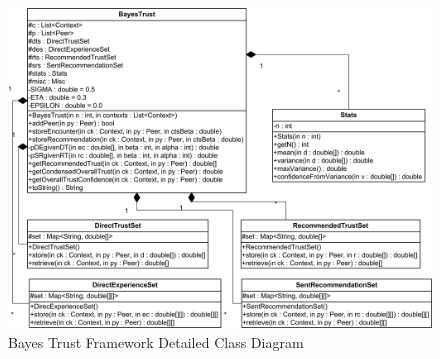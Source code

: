 \begin{figure}[h!]
  \centering  
  \includegraphics[width=1\textwidth]{images/bayestrustdetail}
  \caption{\label{fig:btlowlevel}Bayes Trust Framework Detailed Class Diagram}
\end{figure}